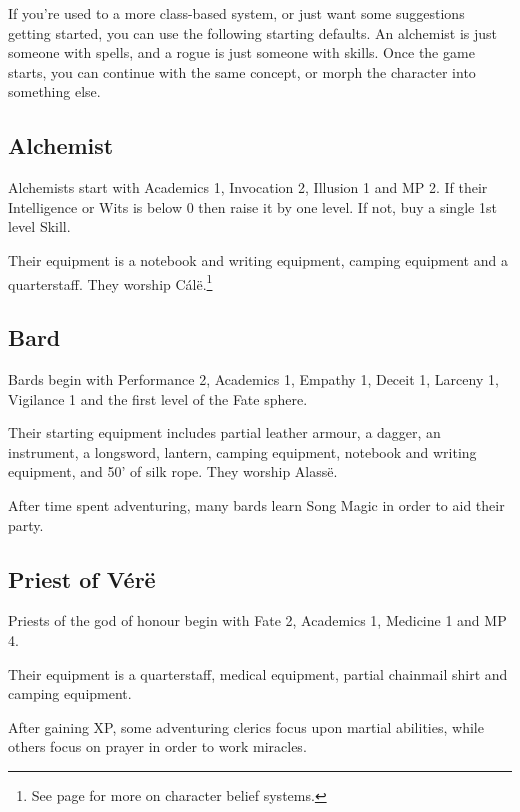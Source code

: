 \documentclass[titlepage,a4paper,openany]{book}
\begin{document}
\begin{multicols}{2}

If you're used to a more class-based system, or just want some suggestions getting started, you can use the following starting defaults.
An alchemist is just someone with spells, and a rogue is just someone with skills.
Once the game starts, you can continue with the same concept, or morph the character into something else.

\subsection{Alchemist}

Alchemists start with Academics 1, Invocation 2, Illusion 1 and MP 2.
If their Intelligence or Wits is below 0 then raise it by one level.
If not, buy a single 1st level Skill.

Their equipment is a notebook and writing equipment, camping equipment and a quarterstaff.
They worship C\'{a}l\"{e}.\footnote{See page \pageref{gods_codes} for more on character belief systems.}

\subsection{Bard}

Bards begin with Performance 2, Academics 1, Empathy 1, Deceit 1, Larceny 1, Vigilance 1 and the first level of the Fate sphere.

Their starting equipment includes partial leather armour, a dagger, an instrument, a longsword, lantern, camping equipment, notebook and writing equipment, and 50' of silk rope.
They worship Alass\"{e}.

After time spent adventuring, many bards learn Song Magic in order to aid their party.

\subsection{Priest of V\'{e}r\"{e}}

Priests of the god of honour begin with Fate 2, Academics 1, Medicine 1 and MP 4.

Their equipment is a quarterstaff, medical equipment, partial chainmail shirt and camping equipment.

After gaining XP, some adventuring clerics focus upon martial abilities, while others focus on prayer in order to work miracles.


\end{multicols}
\end{document}
